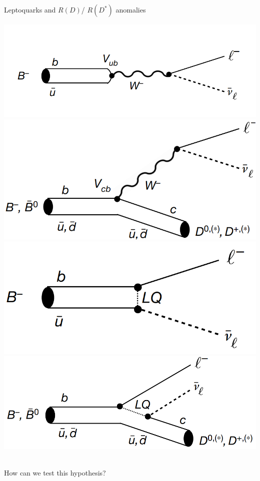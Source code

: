 \documentclass{bredelebeamer}
\begin{document}
\begin{frame}{Leptoquarks and $R(D)$/ $R(D^*)$ anomalies}
	\begin{multicols}{2}
		\includegraphics[width=.99\linewidth]{B_SM_1.png}
		$$ $$
		\includegraphics[width=.99\linewidth]{B_SM_2.png}
		\pause
		\includegraphics[width=.99\linewidth]{B_LQ_1.png}
		$$ $$
		\includegraphics[width=.99\linewidth]{B_LQ_2.png}
	\end{multicols}
	\pause
	\begin{center}
		{\large $ $\\
		How can we test this hypothesis?
		}
	\end{center}
\end{frame}
\end{document}
